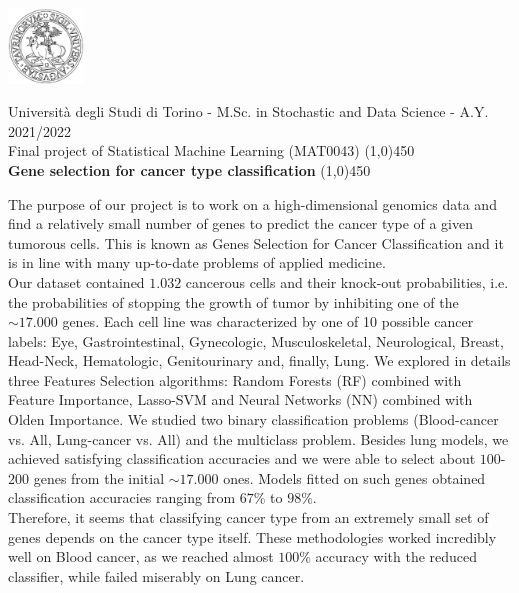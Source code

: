 \documentclass[a4paper,11pt, oneside]{article}  %
\begin{document}
\setcounter{secnumdepth}{2}
\pagestyle{plain} %

\centerline {\includegraphics[width=2cm]{logo.jpg}}
\begin{center}
	Università degli Studi di Torino - M.Sc.  in Stochastic and Data Science - A.Y.  2021/2022 \\
	\Large { Final project of Statistical Machine Learning (MAT0043)}
	\line(1,0){450}\\ 
	\vspace{0.4cm} 
	{ \huge \textbf{Gene selection for cancer type classification} }
	\vspace{0.1cm}
	\line(1,0){450} \\
\end{center}


The purpose of our project is to work on a high-dimensional genomics data and find a relatively small number of genes to predict the cancer type of a given tumorous cells. This is known as Genes Selection for Cancer Classification and it is in line with many up-to-date problems of applied medicine. \\
Our dataset contained $1.032$ cancerous cells and their knock-out probabilities, i.e. the probabilities of stopping the growth of tumor by inhibiting one of the $\sim 17.000$ genes. Each cell line was characterized by one of 10 possible cancer labels: Eye, Gastrointestinal, Gynecologic, Musculoskeletal, Neurological, Breast, Head-Neck, Hematologic, Genitourinary and, finally, Lung. We explored in details three Features Selection algorithms: Random Forests (RF) combined with Feature Importance, Lasso-SVM and Neural Networks (NN) combined with Olden Importance.  We studied two binary classification problems (Blood-cancer vs. All, Lung-cancer vs. All) and the multiclass problem. Besides lung models, we achieved satisfying classification accuracies and we were able to select about $100$-$200$ genes from the initial $\sim 17.000$ ones. Models fitted on such genes obtained classification accuracies ranging from $67\%$ to $98\%$. \\
Therefore, it seems that classifying cancer type from an extremely small set of genes depends on the cancer type itself. These methodologies worked incredibly well on Blood cancer, as  we reached almost $100\%$ accuracy with the reduced classifier,  while failed miserably on Lung cancer.  
\end{document}
